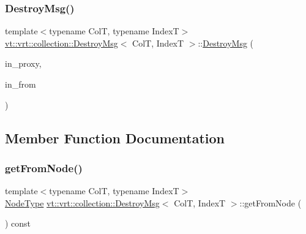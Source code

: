\subsubsection{\texorpdfstring{Destroy\+Msg()}{DestroyMsg()}\hspace{0.1cm}{\footnotesize\ttfamily [2/2]}}
{\footnotesize\ttfamily template$<$typename ColT, typename IndexT$>$ \\
\hyperlink{structvt_1_1vrt_1_1collection_1_1_destroy_msg}{vt\+::vrt\+::collection\+::\+Destroy\+Msg}$<$ ColT, IndexT $>$\+::\hyperlink{structvt_1_1vrt_1_1collection_1_1_destroy_msg}{Destroy\+Msg} (\begin{DoxyParamCaption}\item[{\hyperlink{structvt_1_1vrt_1_1collection_1_1_collection_proxy}{Collection\+Proxy}$<$ ColT, IndexT $>$ const \&}]{in\+\_\+proxy,  }\item[{\hyperlink{namespacevt_a866da9d0efc19c0a1ce79e9e492f47e2}{Node\+Type} const \&}]{in\+\_\+from }\end{DoxyParamCaption})\hspace{0.3cm}{\ttfamily [inline]}}



\subsection{Member Function Documentation}
\mbox{\label{structvt_1_1vrt_1_1collection_1_1_destroy_msg_a598fc97dc1277e545b741e1272da588c}} 
\subsubsection{\texorpdfstring{get\+From\+Node()}{getFromNode()}}
{\footnotesize\ttfamily template$<$typename ColT, typename IndexT$>$ \\
\hyperlink{namespacevt_a866da9d0efc19c0a1ce79e9e492f47e2}{Node\+Type} \hyperlink{structvt_1_1vrt_1_1collection_1_1_destroy_msg}{vt\+::vrt\+::collection\+::\+Destroy\+Msg}$<$ ColT, IndexT $>$\+::get\+From\+Node (\begin{DoxyParamCaption}{ }\end{DoxyParamCaption}) const\hspace{0.3cm}{\ttfamily [inline]}}

